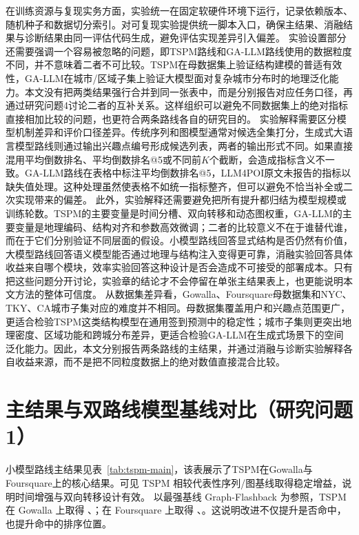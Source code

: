 在训练资源与复现实务方面，实验统一在固定软硬件环境下运行，记录依赖版本、随机种子和数据切分索引。对可复现实验提供统一脚本入口，确保主结果、消融结果与诊断结果由同一评估代码生成，避免评估实现差异引入偏差。
实验设置部分还需要强调一个容易被忽略的问题，即TSPM路线和GA-LLM路线使用的数据粒度不同，并不意味着二者不可比较。TSPM在母数据集上验证结构建模的普适有效性，GA-LLM在城市/区域子集上验证大模型面对复杂城市分布时的地理泛化能力。本文没有把两类结果强行合并到同一张表中，而是分别报告对应任务口径，再通过研究问题4讨论二者的互补关系。这样组织可以避免不同数据集上的绝对指标直接相加比较的问题，也更符合两条路线各自的研究目的。
实验解释需要区分模型机制差异和评价口径差异。传统序列和图模型通常对候选全集打分，生成式大语言模型路线则通过输出兴趣点编号形成候选列表，两者的输出形式不同。如果直接混用平均倒数排名、平均倒数排名@5或不同前$K$个截断，会造成指标含义不一致。GA-LLM路线在表格中标注平均倒数排名@5，LLM4POI原文未报告的指标以缺失值处理。这种处理虽然使表格不如统一指标整齐，但可以避免不恰当补全或二次实现带来的偏差。
此外，实验解释还需要避免把所有提升都归结为模型规模或训练轮数。TSPM的主要变量是时间分槽、双向转移和动态图权重，GA-LLM的主要变量是地理编码、结构对齐和参数高效微调；二者的比较意义不在于谁替代谁，而在于它们分别验证不同层面的假设。小模型路线回答显式结构是否仍然有价值，大模型路线回答语义模型能否通过地理与结构注入变得更可靠，消融实验回答具体收益来自哪个模块，效率实验回答这种设计是否会造成不可接受的部署成本。只有把这些问题分开讨论，实验章的结论才不会停留在单张主结果表上，也更能说明本文方法的整体可信度。
从数据集差异看，Gowalla、Foursquare母数据集和NYC、TKY、CA城市子集对应的难度并不相同。母数据集覆盖用户和兴趣点范围更广，更适合检验TSPM这类结构模型在通用签到预测中的稳定性；城市子集则更突出地理密度、区域功能和跨城分布差异，更适合检验GA-LLM在生成式场景下的空间泛化能力。因此，本文分别报告两条路线的主结果，并通过消融与诊断实验解释各自收益来源，而不是把不同粒度数据上的绝对数值直接混合比较。

\section{主结果与双路线模型基线对比（研究问题1）}
小模型路线主结果见表~\ref{tab:tspm-main}，该表展示了TSPM在Gowalla与Foursquare上的核心结果。可见 TSPM 相较代表性序列/图基线取得稳定增益，说明时间增强与双向转移设计有效。
以最强基线 Graph-Flashback 为参照，TSPM 在 Gowalla 上取得 、；在 Foursquare 上取得 、。这说明改进不仅提升是否命中，也提升命中的排序位置。

